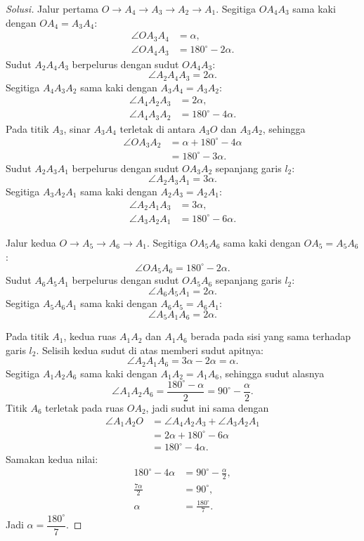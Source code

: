 \documentclass[12pt]{scrartcl}
\begin{document}
\begin{enumerate}[resume]
\begin{proof}[Solusi]
	Jalur pertama $O \to A_{4} \to A_{3} \to A_{2} \to A_{1}$.
	Segitiga $OA_{4}A_{3}$ sama kaki dengan $OA_{4} = A_{3}A_{4}$:
	\begin{align*}
	\angle OA_{3}A_{4} &= \alpha, \\
	\angle OA_{4}A_{3} &= 180^\circ - 2\alpha.
	\end{align*}
	Sudut $A_{2}A_{4}A_{3}$ berpelurus dengan sudut $OA_{4}A_{3}$:
	\[ \angle A_{2}A_{4}A_{3} = 2\alpha. \]
	Segitiga $A_{4}A_{3}A_{2}$ sama kaki dengan $A_{3}A_{4} = A_{3}A_{2}$:
	\begin{align*}
	\angle A_{4}A_{2}A_{3} &= 2\alpha, \\
	\angle A_{4}A_{3}A_{2} &= 180^\circ - 4\alpha.
	\end{align*}
	Pada titik $A_{3}$, sinar $A_{3}A_{4}$ terletak di antara
	$A_{3}O$ dan $A_{3}A_{2}$, sehingga
	\begin{align*}
	\angle OA_{3}A_{2} &= \alpha + 180^\circ - 4\alpha \\
	&= 180^\circ - 3\alpha.
	\end{align*}
	Sudut $A_{2}A_{3}A_{1}$ berpelurus dengan sudut $OA_{3}A_{2}$
	sepanjang garis $l_{2}$:
	\[ \angle A_{2}A_{3}A_{1} = 3\alpha. \]
	Segitiga $A_{3}A_{2}A_{1}$ sama kaki dengan $A_{2}A_{3} = A_{2}A_{1}$:
	\begin{align*}
	\angle A_{2}A_{1}A_{3} &= 3\alpha, \\
	\angle A_{3}A_{2}A_{1} &= 180^\circ - 6\alpha.
	\end{align*}

	Jalur kedua $O \to A_{5} \to A_{6} \to A_{1}$.
	Segitiga $OA_{5}A_{6}$ sama kaki dengan $OA_{5} = A_{5}A_{6}$:
	\[ \angle OA_{5}A_{6} = 180^\circ - 2\alpha. \]
	Sudut $A_{6}A_{5}A_{1}$ berpelurus dengan sudut $OA_{5}A_{6}$
	sepanjang garis $l_{2}$:
	\[ \angle A_{6}A_{5}A_{1} = 2\alpha. \]
	Segitiga $A_{5}A_{6}A_{1}$ sama kaki dengan $A_{6}A_{5} = A_{6}A_{1}$:
	\[ \angle A_{5}A_{1}A_{6} = 2\alpha. \]

	Pada titik $A_{1}$, kedua ruas $A_{1}A_{2}$ dan $A_{1}A_{6}$ berada
	pada sisi yang sama terhadap garis $l_{2}$. Selisih kedua sudut di
	atas memberi sudut apitnya:
	\[ \angle A_{2}A_{1}A_{6} = 3\alpha - 2\alpha = \alpha. \]
	Segitiga $A_{1}A_{2}A_{6}$ sama kaki dengan $A_{1}A_{2} = A_{1}A_{6}$,
	sehingga sudut alasnya
	\[ \angle A_{1}A_{2}A_{6} = \frac{180^\circ - \alpha}{2}
	= 90^\circ - \frac{\alpha}{2}. \]
	Titik $A_{6}$ terletak pada ruas $OA_{2}$, jadi sudut ini sama
	dengan
	\begin{align*}
	\angle A_{1}A_{2}O &= \angle A_{4}A_{2}A_{3} + \angle A_{3}A_{2}A_{1} \\
	&= 2\alpha + 180^\circ - 6\alpha \\
	&= 180^\circ - 4\alpha.
	\end{align*}
	Samakan kedua nilai:
	\begin{align*}
	180^\circ - 4\alpha &= 90^\circ - \frac{\alpha}{2}, \\
	\frac{7\alpha}{2} &= 90^\circ, \\
	\alpha &= \frac{180^\circ}{7}.
	\end{align*}
	Jadi $\alpha = \dfrac{180^\circ}{7}$.
	\end{proof}


\end{enumerate}
\end{document}
